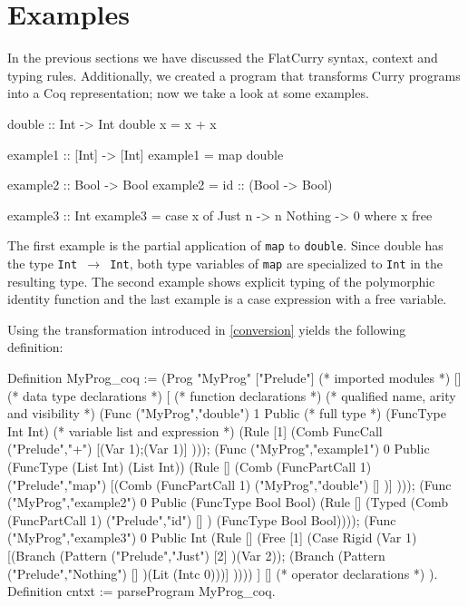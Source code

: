 \documentclass[paper = a4, fleqn, twoside]{scrreprt}
\begin{document}
\section{Examples}
In the previous sections we have discussed the FlatCurry syntax, context and typing rules. Additionally, we created a program that transforms Curry programs into a Coq representation; now we take a look at some examples.
\begin{flushleft}
	\begin{minipage}[t]{.4 \linewidth}
\begin{haskellcode}
double :: Int -> Int
double x = x + x

example1 :: [Int] -> [Int]
example1 = map double

example2 :: Bool -> Bool
example2 = id :: (Bool -> Bool)
\end{haskellcode}
\end{minipage}
\hfill
\vrule
\hspace{.5em}
\begin{minipage}[t]{.5 \linewidth}
\begin{haskellcode}
example3 :: Int
example3 = case x of
             Just n  -> n
             Nothing -> 0
           where x free
\end{haskellcode}
\end{minipage}
\end{flushleft}
The first example is the partial application of \texttt{map} to \texttt{double}. Since double has the type \texttt{Int $\rightarrow$ Int}, both type variables of \texttt{map} are specialized to \texttt{Int} in the resulting type. The second example shows explicit typing of the polymorphic identity function and the last example is a case expression with a free variable.
\par\noindent
Using the transformation introduced in \autoref{conversion} yields the following definition:
\begin{coqcode}
Definition MyProg_coq :=  (Prog "MyProg"
["Prelude"] (* imported modules *)
[] (* data type declarations *)
[ (* function declarations *)
      (* qualified name,  arity and visibility *)
(Func ("MyProg","double") 1         Public 
      (* full type *)
      (FuncType Int Int)
      (* variable list and expression *)
      (Rule  [1] (Comb FuncCall ("Prelude","+") [(Var 1);(Var 1)] )));
(Func ("MyProg","example1") 0  Public 
      (FuncType (List Int) (List Int))
      (Rule  [] (Comb (FuncPartCall 1) ("Prelude","map") [(Comb (FuncPartCall 1)
      ("MyProg","double") [] )] )));
(Func ("MyProg","example2") 0  Public 
      (FuncType Bool Bool)
      (Rule  [] (Typed (Comb (FuncPartCall 1) ("Prelude","id") [] )
      (FuncType Bool Bool))));
(Func ("MyProg","example3") 0  Public 
      Int
      (Rule  [] (Free  [1] (Case Rigid (Var 1) 
        [(Branch (Pattern ("Prelude","Just") [2] )(Var 2));
         (Branch (Pattern ("Prelude","Nothing") [] )(Lit (Intc 0)))] ))))
]
[] (* operator declarations *)
).
Definition cntxt := parseProgram MyProg_coq.
\end{coqcode}
\end{document}
